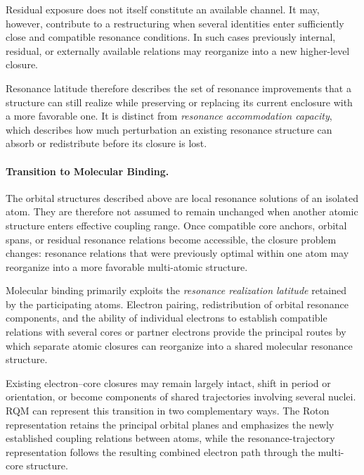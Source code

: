 \documentclass[11pt,a4paper]{article}
\begin{document}
Residual exposure does not itself constitute an available channel. It may, however, contribute to a restructuring when several identities enter sufficiently close and compatible resonance conditions. In such cases previously internal, residual, or externally available relations may reorganize into a new higher-level closure.

Resonance latitude therefore describes the set of resonance improvements that a structure can still realize while preserving or replacing its current enclosure with a more favorable one. It is distinct from \emph{resonance accommodation capacity}, which describes how much perturbation an existing resonance structure can absorb or redistribute before its closure is lost.


%

\paragraph{Transition to Molecular Binding.}
The orbital structures described above are local resonance solutions of an isolated atom. They are therefore not assumed to remain unchanged when another atomic structure enters effective coupling range. Once compatible core anchors, orbital spans, or residual resonance relations become accessible, the closure problem changes: resonance relations that were previously optimal within one atom may reorganize into a more favorable multi-atomic structure.

Molecular binding primarily exploits the \emph{resonance realization latitude} retained by the participating atoms. Electron pairing, redistribution of orbital resonance components, and the ability of individual electrons to establish compatible relations with several cores or partner electrons provide the principal routes by which separate atomic closures can reorganize into a shared molecular resonance structure.

Existing electron–core closures may remain largely intact, shift in period or orientation, or become components of shared trajectories involving several nuclei. RQM can represent this transition in two complementary ways. The Roton representation retains the principal orbital planes and emphasizes the newly established coupling relations between atoms, while the resonance-trajectory representation follows the resulting combined electron path through the multi-core structure.
\end{document}
